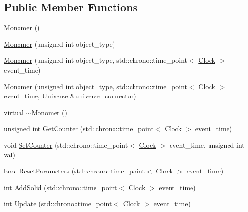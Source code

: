\subsection*{Public Member Functions}
\begin{DoxyCompactItemize}
\item 
\mbox{\hyperlink{classMonomer_a2b1f69caca47d8597e43300ae7076095}{Monomer}} ()
\item 
\mbox{\hyperlink{classMonomer_af2249bf76132ee3802eaccb49b76fb96}{Monomer}} (unsigned int object\+\_\+type)
\item 
\mbox{\hyperlink{classMonomer_acab23e1c41e236417492da5c1e617b1a}{Monomer}} (unsigned int object\+\_\+type, std\+::chrono\+::time\+\_\+point$<$ \mbox{\hyperlink{universe_8h_a0ef8d951d1ca5ab3cfaf7ab4c7a6fd80}{Clock}} $>$ event\+\_\+time)
\item 
\mbox{\hyperlink{classMonomer_ae2b80466a0e724125aee173df34d1a6c}{Monomer}} (unsigned int object\+\_\+type, std\+::chrono\+::time\+\_\+point$<$ \mbox{\hyperlink{universe_8h_a0ef8d951d1ca5ab3cfaf7ab4c7a6fd80}{Clock}} $>$ event\+\_\+time, \mbox{\hyperlink{classUniverse}{Universe}} \&universe\+\_\+connector)
\item 
virtual \mbox{\hyperlink{classMonomer_a802bf239fc55d16783736393edbd6899}{$\sim$\+Monomer}} ()
\item 
unsigned int \mbox{\hyperlink{classMonomer_a4651a4bd0a41d0698821421043e41126}{Get\+Counter}} (std\+::chrono\+::time\+\_\+point$<$ \mbox{\hyperlink{universe_8h_a0ef8d951d1ca5ab3cfaf7ab4c7a6fd80}{Clock}} $>$ event\+\_\+time)
\item 
void \mbox{\hyperlink{classMonomer_a6f0dfa4382b3d4fa19b7ee0fb8fe7a55}{Set\+Counter}} (std\+::chrono\+::time\+\_\+point$<$ \mbox{\hyperlink{universe_8h_a0ef8d951d1ca5ab3cfaf7ab4c7a6fd80}{Clock}} $>$ event\+\_\+time, unsigned int val)
\item 
bool \mbox{\hyperlink{classMonomer_a16a692cf11117581c9b4ebbed3c04c9c}{Reset\+Parameters}} (std\+::chrono\+::time\+\_\+point$<$ \mbox{\hyperlink{universe_8h_a0ef8d951d1ca5ab3cfaf7ab4c7a6fd80}{Clock}} $>$ event\+\_\+time)
\item 
int \mbox{\hyperlink{classMonomer_ac03023c0d1bb67e5f11091af7ad3735d}{Add\+Solid}} (std\+::chrono\+::time\+\_\+point$<$ \mbox{\hyperlink{universe_8h_a0ef8d951d1ca5ab3cfaf7ab4c7a6fd80}{Clock}} $>$ event\+\_\+time)
\item 
int \mbox{\hyperlink{classMonomer_a48dc2ffb5da8cf3dc3f4f56bba674de6}{Update}} (std\+::chrono\+::time\+\_\+point$<$ \mbox{\hyperlink{universe_8h_a0ef8d951d1ca5ab3cfaf7ab4c7a6fd80}{Clock}} $>$ event\+\_\+time)

\end{DoxyCompactItemize}

